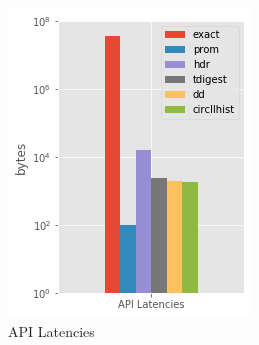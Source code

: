 \documentclass{article}
\theoremstyle{plain}
\theoremstyle{remark}
\begin{document}
\begin{figure}[t!]
\begin{subfigure}[t]{0.3\textwidth}
      \includegraphics[width=\textwidth]{evaluation/images/API_Latencies_size.png}
      \caption{API Latencies}
    \end{subfigure}
    ~
    \begin{subfigure}[t]{0.3\textwidth}

\end{subfigure}
\end{figure}
\end{document}
